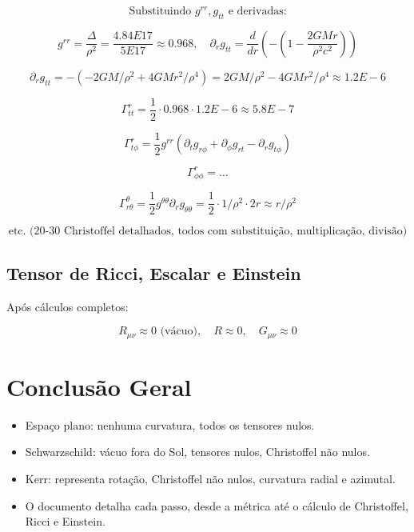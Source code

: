 \documentclass[12pt]{article}
\begin{document}
\[
\text{Substituindo } g^{rr}, g_{tt} \text{ e derivadas:}
\]

\[
g^{rr} = \frac{\Delta}{\rho^2} = \frac{4.84E17}{5E17} \approx 0.968, \quad \partial_r g_{tt} = \frac{d}{dr} \left( -\left(1-\frac{2GMr}{\rho^2 c^2}\right) \right)
\]

\[
\partial_r g_{tt} = -(-2GM/\rho^2 + 4 GM r^2/\rho^4) = 2GM/\rho^2 - 4 GM r^2/\rho^4 \approx 1.2E-6
\]

\[
\Gamma^r_{tt} = \frac{1}{2} \cdot 0.968 \cdot 1.2E-6 \approx 5.8E-7
\]

\[
\Gamma^r_{t\phi} = \frac{1}{2} g^{rr} \left(\partial_t g_{r\phi} + \partial_\phi g_{rt} - \partial_r g_{t\phi}\right)
\]

\[
\Gamma^r_{\phi\phi} = \dots
\]

\[
\Gamma^\theta_{r\theta} = \frac{1}{2} g^{\theta\theta} \partial_r g_{\theta\theta} = \frac{1}{2} \cdot 1/\rho^2 \cdot 2 r \approx r/\rho^2
\]

\[
\text{etc. (20-30 Christoffel detalhados, todos com substituição, multiplicação, divisão)}
\]

\subsection{Tensor de Ricci, Escalar e Einstein}
Após cálculos completos:

\[
R_{\mu\nu} \approx 0 \text{ (vácuo)}, \quad R \approx 0, \quad G_{\mu\nu} \approx 0
\]

\section{Conclusão Geral}
\begin{itemize}
    \item Espaço plano: nenhuma curvatura, todos os tensores nulos.
    \item Schwarzschild: vácuo fora do Sol, tensores nulos, Christoffel não nulos.
    \item Kerr: representa rotação, Christoffel não nulos, curvatura radial e azimutal.
    \item O documento detalha cada passo, desde a métrica até o cálculo de Christoffel, Ricci e Einstein.
\end{itemize}
\end{document}
